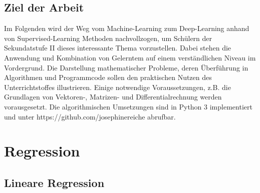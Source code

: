 \documentclass[a4paper]{scrreprt}
\begin{document}
\section{Ziel der Arbeit}
Im Folgenden wird der Weg vom Machine-Learning zum Deep-Learning anhand von Supervised-Learning Methoden nachvollzogen, um Schülern der Sekundatstufe II dieses interessante Thema vorzustellen. Dabei stehen die Anwendung und Kombination von Gelerntem auf einem verständlichen Niveau im Vordergrund. Die Darstellung mathematischer Probleme, deren Überführung in Algorithmen und Programmcode sollen den praktischen Nutzen des Unterrichtstoffes illustrieren. Einige notwendige Voraussetzungen, z.B. die Grundlagen von Vektoren-, Matrizen- und Differentialrechnung werden vorausgesetzt. Die algorithmischen Umsetzungen sind in Python 3 implementiert und unter https://github.com/josephinereiche abrufbar.
\chapter{Regression}
\section{Lineare Regression}
\end{document}
